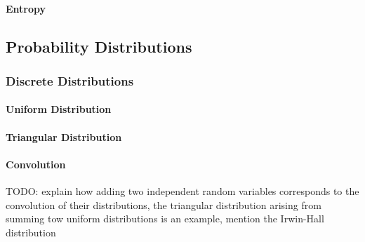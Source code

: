 


\paragraph{Entropy}










\subsection{Probability Distributions}


\subsubsection{Discrete Distributions}

\paragraph{Uniform Distribution}

\paragraph{Triangular Distribution}

\paragraph{Convolution} TODO: explain how adding two independent random variables corresponds to the convolution of their distributions, the triangular distribution arising from summing tow uniform distributions is an example, mention the Irwin-Hall distribution

